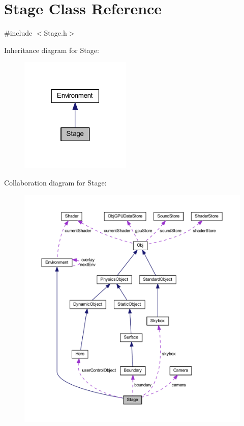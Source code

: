 \hypertarget{class_stage}{}\section{Stage Class Reference}
\label{class_stage}


{\ttfamily \#include $<$Stage.\+h$>$}



Inheritance diagram for Stage\+:
\nopagebreak
\begin{figure}[H]
\begin{center}
\leavevmode
\includegraphics[width=150pt]{class_stage__inherit__graph}
\end{center}
\end{figure}


Collaboration diagram for Stage\+:
\nopagebreak
\begin{figure}[H]
\begin{center}
\leavevmode
\includegraphics[width=350pt]{class_stage__coll__graph}
\end{center}
\end{figure}
